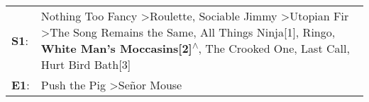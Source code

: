 \begin{supertabular}{p{0.03\textwidth}p{0.92\textwidth}}
 \textbf{S1}:  &  Nothing Too Fancy\textsuperscript{} \textgreater \enspace Roulette\textsuperscript{}, \enspace Sociable Jimmy\textsuperscript{} \textgreater \enspace Utopian Fir\textsuperscript{} \textgreater \enspace The Song Remains the Same\textsuperscript{}, \enspace All Things Ninja[1]\textsuperscript{}, \enspace Ringo\textsuperscript{}, \enspace \textbf{White Man's Moccasins[2]\textsuperscript{$\wedge$}}, \enspace The Crooked One\textsuperscript{}, \enspace Last Call\textsuperscript{}, \enspace Hurt Bird Bath[3]\textsuperscript{}  \enspace  \\
 \textbf{E1}:  &                                                                                                                                                                                                                                                                                                                                                                                                                                                             Push the Pig\textsuperscript{} \textgreater \enspace Señor Mouse\textsuperscript{}  \enspace  \\
\end{supertabular}
